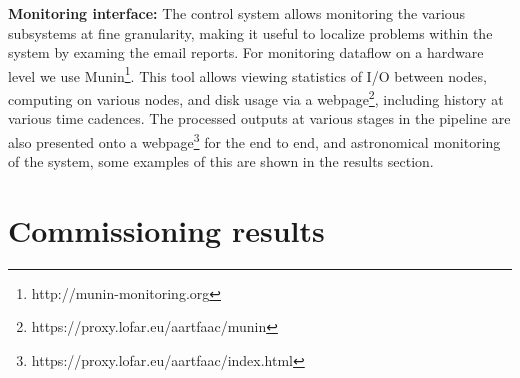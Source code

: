 \documentclass{ws-jai}
\begin{document}
\noindent \textbf  {Monitoring interface:} The control  system allows
monitoring the  various  subsystems at  fine  granularity,  making  it useful
to  localize problems within  the system by examing the email reports.  For
monitoring dataflow on a hardware level we use
Munin\footnote{http://munin-monitoring.org}. This tool allows viewing
statistics  of I/O between nodes,  computing on various nodes,  and disk usage
via    a   webpage\footnote{https://proxy.lofar.eu/aartfaac/munin},
including history  at various time  cadences.  The processed outputs  at
various stages in the pipeline are also presented onto a
webpage\footnote{https://proxy.lofar.eu/aartfaac/index.html} for the end to
end, and astronomical monitoring  of the system, some  examples of this are
shown in the results section.

\section {\label{sec:results} Commissioning results}
\end{document}
